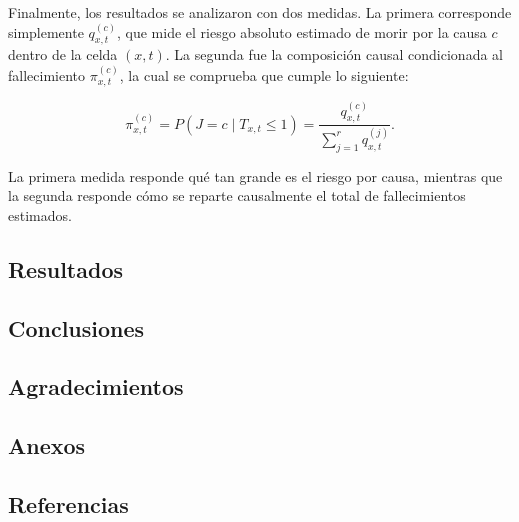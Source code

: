\documentclass[
  spanish,
  letterpaper,
  DIV=11,
  numbers=noendperiod]{scrartcl}
\begin{document}
Finalmente, los resultados se analizaron con dos medidas. La primera
corresponde simplemente \(q_{x,t}^{(c)}\), que mide el riesgo absoluto
estimado de morir por la causa \(c\) dentro de la celda \((x,t)\). La
segunda fue la composición causal condicionada al fallecimiento
\(\pi_{x,t}^{(c)}\), la cual se comprueba que cumple lo siguiente:

\[\pi_{x,t}^{(c)}
=
P(J=c\mid T_{x,t}\leq 1)
=
\frac{q_{x,t}^{(c)}}{\sum_{j=1}^{r}q_{x,t}^{(j)}}.\]

La primera medida responde qué tan grande es el riesgo por causa,
mientras que la segunda responde cómo se reparte causalmente el total de
fallecimientos estimados.

\subsection{Resultados}\label{resultados}

\subsection{Conclusiones}\label{conclusiones}

\subsection{Agradecimientos}\label{agradecimientos}

\subsection{Anexos}\label{anexos}

\subsection{Referencias}\label{referencias}
\end{document}
